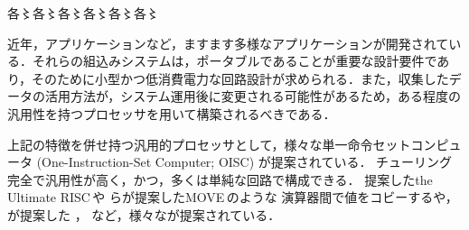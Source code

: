 \documentclass[12pt,landscape,hiragino-pro]{ltjtarticle}
\begin{document}
\makeatletter
各〻各{\selectfont 〻}各〻各〻各〻各〻
\makeatother

近年，アプリケーションなど，ますます多様なアプリケーションが開発されている．それらの組込みシステムは，ポータブルであることが重要な設計要件であり，そのために小型かつ低消費電力な回路設計が求められる．また，収集したデータの活用方法が，システム運用後に変更される可能性があるため，ある程度の汎用性を持つプロセッサを用いて構築されるべきである．

上記の特徴を併せ持つ汎用的プロセッサとして，様々な単一命令セットコンピュータ (One-Instruction-Set Computer; OISC) が提案されている．
チューリング完全で汎用性が高く，かつ，多くは単純な回路で構成できる．
提案した\JAspace the Ultimate RISC\,\cite{Jones1988}\AJspace や
らが提案した\JAspace MOVE\,\cite{Corporaal1991,Corporaal1993}\AJspace のような
演算器間で値をコビーするや，%
が提案した%
\cite{Mazonka2009}，
など，様々なが提案されている．
\end{document}
